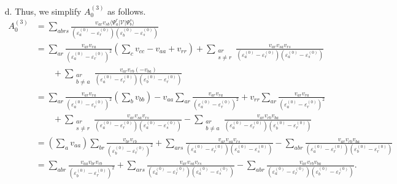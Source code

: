 \documentclass[a4paper]{book}
\newcounter{solution}[chapter]
\begin{document}
\begin{solution}
\begin{itemize}
	\item[d.] Thus, we simplify $A^{(3)}_0$ as follows.
	\begin{align*}
		A^{(3)}_0 &= \sum_{abrs} \frac{ v_{ar} v_{sb} \langle \Psi^r_a | \mathscr{V} | \Psi^s_b \rangle}{ ( \varepsilon^{(0)}_a - \varepsilon^{(0)}_r) ( \varepsilon^{(0)}_b - \varepsilon^{(0)}_s) } \\
		&= \sum_{ar} \frac{ v_{ar} v_{ra} }{ ( \varepsilon^{(0)}_a - \varepsilon^{(0)}_r )^2} \left( \sum_{c} v_{cc} - v_{aa} + v_{rr} \right) + \sum_{ \substack{ar \\ s \neq r} } \frac{ v_{ar} v_{sa} v_{rs} }{ ( \varepsilon^{(0)}_a - \varepsilon^{(0)}_r)( \varepsilon^{(0)}_a - \varepsilon^{(0)}_s) } \\
		&\hspace{2em} + \sum_{ \substack{ar \\ b \neq a } } \frac{ v_{ar} v_{rb} ( - v_{ba} ) }{ ( \varepsilon^{(0)}_a - \varepsilon^{(0)}_r)( \varepsilon^{(0)}_b - \varepsilon^{(0)}_r) } \\
		&= \sum_{ar} \frac{ v_{ar} v_{ra} }{ ( \varepsilon^{(0)}_a - \varepsilon^{(0)}_r )^2} \left( \sum_{b} v_{bb} \right) - v_{aa} \sum_{ar} \frac{ v_{ar} v_{ra} }{ ( \varepsilon^{(0)}_a - \varepsilon^{(0)}_r )^2} + v_{rr} \sum_{ar} \frac{ v_{ar} v_{ra} }{ ( \varepsilon^{(0)}_a - \varepsilon^{(0)}_r )^2} \\
		&\hspace{2em} + \sum_{ \substack{ar \\ s \neq r} } \frac{ v_{ar} v_{sa} v_{rs} }{ ( \varepsilon^{(0)}_a - \varepsilon^{(0)}_r)( \varepsilon^{(0)}_a - \varepsilon^{(0)}_s) } - \sum_{ \substack{ar \\ b \neq a } } \frac{ v_{ar} v_{rb} v_{ba} }{ ( \varepsilon^{(0)}_a - \varepsilon^{(0)}_r)( \varepsilon^{(0)}_b - \varepsilon^{(0)}_r) } \\
		&= \left( \sum_{a} v_{aa} \right) \sum_{br} \frac{ v_{br} v_{rb} }{ ( \varepsilon^{(0)}_b - \varepsilon^{(0)}_r )^2} + \sum_{ ars } \frac{ v_{ar} v_{sa} v_{rs} }{ ( \varepsilon^{(0)}_a - \varepsilon^{(0)}_r)( \varepsilon^{(0)}_a - \varepsilon^{(0)}_s) } - \sum_{ abr } \frac{ v_{ar} v_{rb} v_{ba} }{ ( \varepsilon^{(0)}_a - \varepsilon^{(0)}_r)( \varepsilon^{(0)}_b - \varepsilon^{(0)}_r) } \\
		&= \sum_{abr} \frac{ v_{aa} v_{br} v_{rb} }{ ( \varepsilon^{(0)}_b - \varepsilon^{(0)}_r )^2} + \sum_{ ars } \frac{ v_{ar} v_{sa} v_{rs} }{ ( \varepsilon^{(0)}_a - \varepsilon^{(0)}_r)( \varepsilon^{(0)}_a - \varepsilon^{(0)}_s) } - \sum_{ abr } \frac{ v_{ar} v_{rb} v_{ba} }{ ( \varepsilon^{(0)}_a - \varepsilon^{(0)}_r)( \varepsilon^{(0)}_b - \varepsilon^{(0)}_r) } .

\end{align*}
\end{itemize}
\end{solution}
\end{document}
